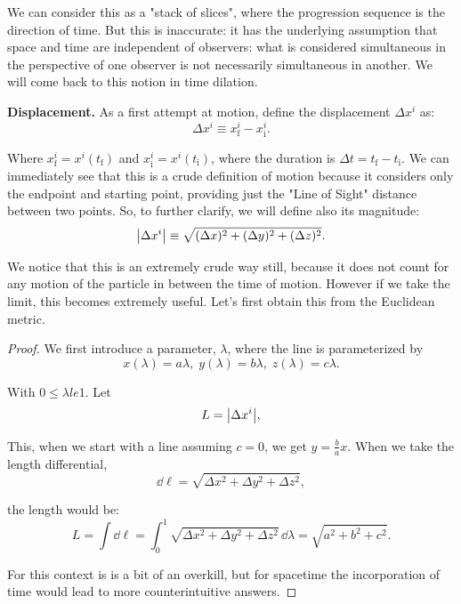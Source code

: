 \documentclass[10pt]{article}
\begin{document}
	We can consider this as a "stack of slices", where the progression sequence is the direction of time. But this is inaccurate: it has the underlying assumption that space and time are independent of observers: what is considered simultaneous in the perspective of one observer is not necessarily simultaneous in another. We will come back to this notion in time dilation.

	\vspace{2\baselineskip}
	\textbf{Displacement.} As a first attempt at motion, define the displacement $\Delta x^{i}$ as:
	\begin{equation}
	  \Delta x^{i} \equiv x^{i}_{\mathrm{f}} - x^{i}_{\mathrm{i}}.
	\end{equation}

	Where $x^{i}_{\mathrm{f}} = x^{i}(t_{\mathrm{f}})$ and $x^{i}_{\mathrm{i}} = x^{i}(t_{\mathrm{i}})$, where the duration is $\Delta t = t_{\mathrm{f}}-t_{\mathrm{i}}$. We can immediately see that this is a crude definition of motion because it considers only the endpoint and starting point, providing just the "Line of Sight" distance between two points. So, to further clarify, we will define also its magnitude:
	\begin{equation}
	  \vqty{\Delta x^{i}} \equiv \sqrt{(\Delta x)^{2} + (\Delta y)^{2} + (\Delta z)^{2}}.
	\end{equation} 

	We notice that this is an extremely crude way still, because it does not count for any motion of the particle in between the time of motion. However if we take the limit, this becomes extremely useful. Let's first obtain this from the Euclidean metric. 
	\begin{proof}
		We first introduce a parameter, $\lambda$, where the line is parameterized by
		\begin{equation}
		  x(\lambda) = a \lambda, \; y(\lambda) = b \lambda, \; z(\lambda) = c \lambda.
		\end{equation}

		With $0 \le \lambda le 1$. Let
		\begin{equation}
		  L = \vqty{\Delta x^{i}},
		\end{equation}

		This, when we start with a line assuming $c=0$, we get $y = \frac{b}{a} x.$ When we take the length differential,
		\begin{equation}
		  \dd \ell = \sqrt{\Delta x^{2} + \Delta y^{2} + \Delta z^{2}},
		\end{equation}

		the length would be:
		\begin{equation}
		  L = \int \dd \ell = \int_{0}^{1} \sqrt{\Delta x^{2} + \Delta y^{2} + \Delta z^{2}} \,\dd \lambda = \sqrt{a^{2}+b^{2}+c^{2}}.
		\end{equation}

		For this context is is a bit of an overkill, but for spacetime the incorporation of time would lead to more counterintuitive answers.
	\end{proof}
\end{document}
